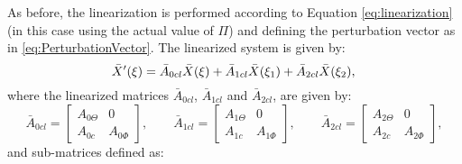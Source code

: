 \documentclass[../main.tex]{subfiles}
\begin{document}
As before, the linearization is performed according to Equation \eqref{eq:linearization} (in this case using the actual value of $\Pi$) and defining the perturbation vector as in \eqref{eq:PerturbationVector}. The linearized system is given by:	
\begin{equation}
\bar{X}'(\xi) =	\bar{A}_{0cl}\bar{X}(\xi) + \bar{A}_{1cl}\bar{X}(\xi_1) + \bar{A}_{2cl} \bar{X}(\xi_2),\\
\label{eq:totaldynamicslinearsrobust}
\end{equation}	
where the linearized matrices $\bar{A}_{0cl}$, $\bar{A}_{1cl}$ and $\bar{A}_{2cl}$, are given by:
\begin{equation}
\bar{A}_{0cl} = 
\begin{bmatrix}
A_{0\Theta} & 0 \\
A_{0c} & A_{0\Phi}
\end{bmatrix}, \qquad
\bar{A}_{1cl} =
\begin{bmatrix}
A_{1\Theta} & 0 \\
A_{1c} & A_{1\Phi}
\end{bmatrix}, \qquad
\bar{A}_{2cl} =
\begin{bmatrix}
A_{2\Theta} & 0 \\
A_{2c} & A_{2\Phi} 
\end{bmatrix}, \label{eq:LinearMatricesRobust}
\end{equation}
and sub-matrices defined as:
\end{document}
